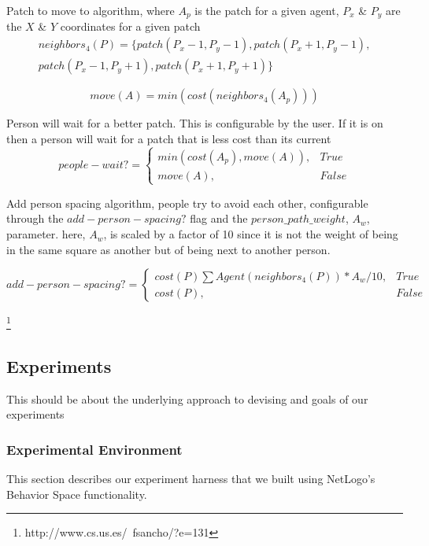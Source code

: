 \documentclass[12pt,letterpaper]{article}
\begin{document}
Patch to move to algorithm, where $A_p$ is the patch for a given agent, $P_x$ \& $P_y$ are the $X$ \& $Y$ coordinates for a given patch
\begin{align}
neighbors_4 (P)  = \{patch(P_x - 1, P_y -1), patch(P_x + 1, P_y -1), \nonumber \\ 
patch(P_x - 1, P_y + 1),patch(P_x + 1, P_y + 1)\}   
\end{align}

\begin{equation}
move(A) = min(cost(neighbors_4 (A_p)))
\end{equation}

Person will wait for a better patch.  This is configurable by the user. If it is on then a person will wait for a patch that is less cost than its current
\begin{equation}
people-wait?=
\begin{cases}
min(cost(A_p), move(A)), & True\\
move(A), & False
\end{cases}
\end{equation}

Add person spacing algorithm, people try to avoid each other, configurable through the $add-person-spacing?$ flag and the $person\_path\_weight$, $A_w$, parameter.  here, $A_w$, is scaled by a factor of 10 since it is not the weight of being in the same square as another but of being next to another person.

\begin{equation}
add-person-spacing?=
\begin{cases}
	cost(P) \sum Agent(neighbors_4(P)) * A_w / 10, & True \\
	cost(P), & False
\end{cases}
\end{equation}

\cite{mirahmadiNovelAlgorithmRealtime2012}
\footnote{http://www.cs.us.es/~fsancho/?e=131}

\subsection{Experiments}

This should be about the underlying approach to devising and goals of our experiments

\subsubsection{Experimental Environment}
This section describes our experiment harness that we built using NetLogo's
Behavior Space functionality.
\end{document}

